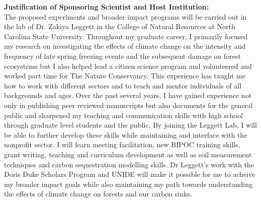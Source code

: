 \documentclass[11pt]{article}\usepackage[]{graphicx}\usepackage[]{color}
\begin{document}
{\noindent\Large{\textbf{Justification of Sponsoring Scientist and Host Institution:}}}\\
The proposed experiments and broader impact programs will be carried out in the lab of Dr. Zakiya Leggett in the College of Natural Resources at North Carolina State University. Throughout my graduate career, I primarily focused my research on investigating the effects of climate change on the intensity and frequency of late spring freezing events and the subsequent damage on forest ecosystems but I also helped lead a citizen science program and volunteered and worked part time for The Nature Conservancy. This experience has taught me how to work with different sectors and to teach and mentor individuals of all backgrounds and ages. Over the past several years, I have gained experience not only in publishing peer reviewed manuscripts but also documents for the general public and sharpened my teaching and communication skills with high school through graduate level students and the public. By joining the Leggett Lab, I will be able to further develop these skills while maintaining and interface with the nonprofit sector. I will learn meeting facilitation, new BIPOC training skills, grant writing, teaching and curriculum development as well as soil measurement techniques and carbon sequestration modelling skills. Dr Leggett's work with the Doris Duke Scholars Program and UNIDE will make it possible for me to acheive my broader impact goals while also maintaining my path towards understanding the effects of climate change on forests and our carbon sinks.\\
\end{document}
